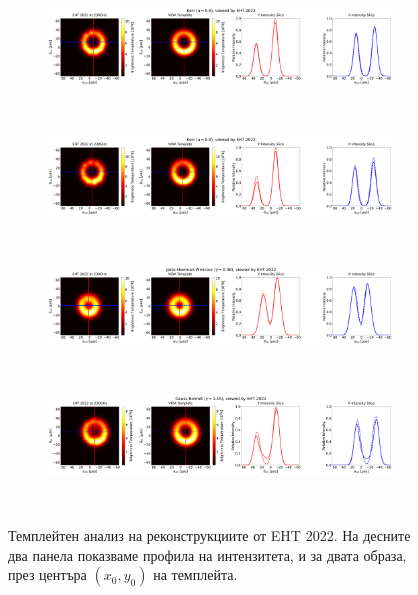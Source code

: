 \begin{figure}[h!]
	\centering
	\begin{subfigure}{12cm}
		\hspace{-1.5cm}
		\includegraphics[scale = 0.13]{Ehtim_Vida_plot_2022_230_Sch.png}
	\end{subfigure}\\
	\begin{subfigure}{12cm}
		\hspace{-1.5cm}
		\includegraphics[scale = 0.13]{Ehtim_Vida_plot_2022_230_Kerr.png}
	\end{subfigure}\\
	\begin{subfigure}{12cm}
		\hspace{-1.5cm}
		\includegraphics[scale = 0.13]{Ehtim_Vida_plot_2022_230_JNW.png}
	\end{subfigure}\\
	\begin{subfigure}{12cm}
		\hspace{-1.5cm}
		\includegraphics[scale = 0.13]{Ehtim_Vida_plot_2022_230_GB.png}
	\end{subfigure}\\
	\label{VIDA_EHT_ng2022}
	\caption[Темплейтен анализ на реконструкциите от EHT 2022]{Темплейтен анализ на реконструкциите от EHT 2022. На десните два панела показваме профила на интензитета, и за двата образа, през центъра $(x_0,y_0)$ на темплейта.} 
\end{figure}
\newline

